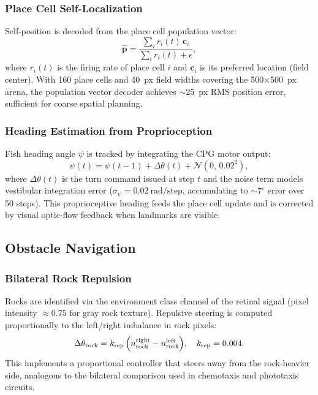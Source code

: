 \documentclass[11pt,a4paper]{article}
\begin{document}
\subsubsection{Place Cell Self-Localization}

Self-position is decoded from the place cell population vector:
\begin{equation}\label{eq:place_decode}
  \hat{\mathbf{p}} = \frac{\sum_i r_i(t)\,\mathbf{c}_i}{\sum_i r_i(t) + \epsilon},
\end{equation}
where $r_i(t)$ is the firing rate of place cell $i$ and $\mathbf{c}_i$
is its preferred location (field center).
With 160 place cells and 40~px field widths covering the 500$\times$500~px
arena, the population vector decoder achieves $\sim$25~px RMS position error,
sufficient for coarse spatial planning.

\subsubsection{Heading Estimation from Proprioception}

Fish heading angle $\psi$ is tracked by integrating the CPG motor output:
\begin{equation}\label{eq:heading}
  \psi(t) = \psi(t-1) + \Delta\theta(t) + \mathcal{N}(0,\,0.02^2),
\end{equation}
where $\Delta\theta(t)$ is the turn command issued at step $t$ and
the noise term models vestibular integration error
($\sigma_\psi = 0.02~\text{rad/step}$, accumulating to $\sim$7$^\circ$
error over 50 steps).
This proprioceptive heading feeds the place cell update and is
corrected by visual optic-flow feedback when landmarks are visible.

\subsection{Obstacle Navigation}\label{sec:obstacle_nav}

\subsubsection{Bilateral Rock Repulsion}

Rocks are identified via the environment class channel of the retinal
signal (pixel intensity $\approx 0.75$ for gray rock texture).
Repulsive steering is computed proportionally to the left/right
imbalance in rock pixels:
\begin{equation}\label{eq:rock_repulsion}
  \Delta\theta_\mathrm{rock} = k_\mathrm{rep}\,
    \Bigl(n_\mathrm{rock}^\mathrm{right} - n_\mathrm{rock}^\mathrm{left}\Bigr),
  \quad k_\mathrm{rep} = 0.004.
\end{equation}
This implements a proportional controller that steers away from the
rock-heavier side, analogous to the bilateral comparison used in
chemotaxis and phototaxis circuits.
\end{document}
